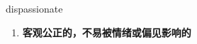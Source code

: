 
\begin{frame}
{\huge dispassionate}
\begin{center}
\begin{enumerate}\Large
  \item \textbf{客观公正的，不易被情绪或偏见影响的}
\end{enumerate}
\end{center}
\end{frame}

